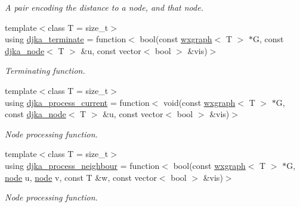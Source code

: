\begin{DoxyCompactItemize}
\begin{DoxyCompactList}\small\item\em A pair encoding the distance to a node, and that node. \end{DoxyCompactList}\item 
{\footnotesize template$<$class T  = size\+\_\+t$>$ }\\using \hyperlink{namespacelgraph_1_1traversal_1_1dijkstra_a275e9ff05e4d3199245b9642cc88fc74}{djka\+\_\+terminate} = function$<$ bool(const \hyperlink{classlgraph_1_1utils_1_1wxgraph}{wxgraph}$<$ T $>$ $\ast$G, const \hyperlink{namespacelgraph_1_1traversal_1_1dijkstra_a06495bda19735564a02a6e98198a0980}{djka\+\_\+node}$<$ T $>$ \&u, const vector$<$ bool $>$ \&vis)$>$
\begin{DoxyCompactList}\small\item\em Terminating function. \end{DoxyCompactList}\item 
{\footnotesize template$<$class T  = size\+\_\+t$>$ }\\using \hyperlink{namespacelgraph_1_1traversal_1_1dijkstra_a1b15b8b987d2eea35dd01676ba1d3b35}{djka\+\_\+process\+\_\+current} = function$<$ void(const \hyperlink{classlgraph_1_1utils_1_1wxgraph}{wxgraph}$<$ T $>$ $\ast$G, const \hyperlink{namespacelgraph_1_1traversal_1_1dijkstra_a06495bda19735564a02a6e98198a0980}{djka\+\_\+node}$<$ T $>$ \&u, const vector$<$ bool $>$ \&vis)$>$
\begin{DoxyCompactList}\small\item\em Node processing function. \end{DoxyCompactList}\item 
{\footnotesize template$<$class T  = size\+\_\+t$>$ }\\using \hyperlink{namespacelgraph_1_1traversal_1_1dijkstra_abd266610f7bab0d52a202238ca539d38}{djka\+\_\+process\+\_\+neighbour} = function$<$ bool(const \hyperlink{classlgraph_1_1utils_1_1wxgraph}{wxgraph}$<$ T $>$ $\ast$G, \hyperlink{namespacelgraph_1_1utils_a7bd66ede3805ef121bc2835bd48de0cf}{node} u, \hyperlink{namespacelgraph_1_1utils_a7bd66ede3805ef121bc2835bd48de0cf}{node} v, const T \&w, const vector$<$ bool $>$ \&vis)$>$
\begin{DoxyCompactList}\small\item\em Node processing function. \end{DoxyCompactList}\end{DoxyCompactItemize}
